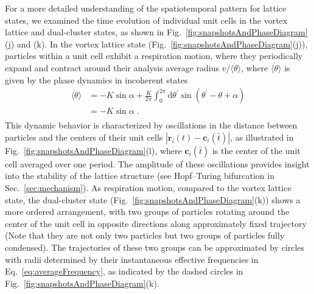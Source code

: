 \documentclass{article}
\begin{document}
For a more detailed understanding of the spatiotemporal pattern for lattice states, we examined the time evolution of individual unit cells in the vortex lattice and dual-cluster states, as shown in Fig.~\ref{fig:snapshotsAndPhaseDiagram}(j) and (k). In the vortex lattice state (Fig.~\ref{fig:snapshotsAndPhaseDiagram}(j)), particles within a unit cell exhibit a respiration motion, where they periodically expand and contract around their analysis average radius $v/\langle \dot{\theta} \rangle$, where $\langle \dot{\theta} \rangle$ is given by the phase dynamics in incoherent states
\begin{equation}
    \begin{aligned}
        \langle \dot{\theta}\rangle &=-K\sin \alpha +\frac{K}{2\pi}\int_0^{2\pi}{\mathrm{d}\theta ^{\prime}\sin \left( \theta ^{\prime}-\theta +\alpha \right)}\\
        &=-K\sin \alpha\;.\\
    \end{aligned}  
    \label{eq:averageFrequency}
\end{equation}
This dynamic behavior is characterized by oscillations in the distance between particles and the centers of their unit cells $\left| \mathbf{r}_i\left( t \right) -\mathbf{c}_i\left( \bar{t} \right) \right|$, as illustrated in Fig.~\ref{fig:snapshotsAndPhaseDiagram}(l), where $\mathbf{c}_i\left( \bar{t} \right)$ is the center of the unit cell averaged over one period. 
The amplitude of these oscillations provides insight into the stability of the lattice structure (see Hopf–Turing bifurcation in Sec.~\ref{sec:mechanism}). As respiration motion, compared to the vortex lattice state, the dual-cluster state (Fig.~\ref{fig:snapshotsAndPhaseDiagram}(k)) shows a more ordered arrangement, with two groups of particles rotating around the center of the unit cell in opposite directions along approximately fixed trajectory (Note that they are not only two particles but two groups of particles fully condensed). The trajectories of these two groups can be approximated by circles with radii determined by their instantaneous effective frequencies in Eq.~\ref{eq:averageFrequency}, as indicated by the dashed circles in Fig.~\ref{fig:snapshotsAndPhaseDiagram}(k). 


\end{document}
